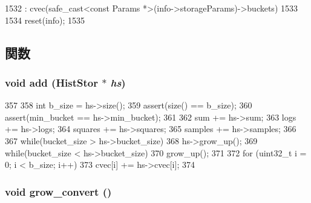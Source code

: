 \begin{DoxyCode}
1532         : cvec(safe_cast<const Params *>(info->storageParams)->buckets)
1533     {
1534         reset(info);
1535     }
\end{DoxyCode}


\subsection{関数}
\hypertarget{classStats_1_1HistStor_a97c8fa70b9ff6956199f366dfafa678d}{
\subsubsection[{add}]{\setlength{\rightskip}{0pt plus 5cm}void add ({\bf HistStor} $\ast$ {\em hs})}}
\label{classStats_1_1HistStor_a97c8fa70b9ff6956199f366dfafa678d}



\begin{DoxyCode}
357 {
358     int b_size = hs->size();
359     assert(size() == b_size);
360     assert(min_bucket == hs->min_bucket);
361 
362     sum += hs->sum;
363     logs += hs->logs;
364     squares += hs->squares;
365     samples += hs->samples;
366 
367     while(bucket_size > hs->bucket_size)
368         hs->grow_up();
369     while(bucket_size < hs->bucket_size)
370         grow_up();
371 
372     for (uint32_t i = 0; i < b_size; i++)
373         cvec[i] += hs->cvec[i];
374 }
\end{DoxyCode}
\hypertarget{classStats_1_1HistStor_a35cf15a76de3683b6cbd9243f999e851}{
\subsubsection[{grow\_\-convert}]{\setlength{\rightskip}{0pt plus 5cm}void grow\_\-convert ()}}
\label{classStats_1_1HistStor_a35cf15a76de3683b6cbd9243f999e851}



